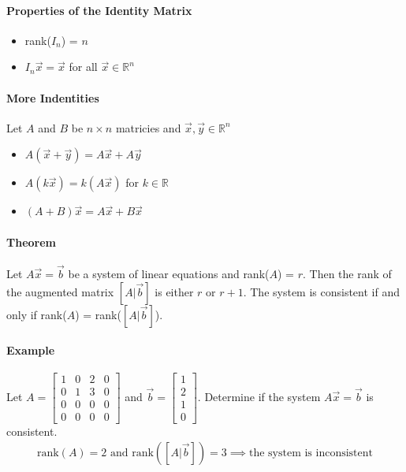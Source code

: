 \paragraph*{Properties of the Identity Matrix}
\begin{itemize}
    \item rank($I_n$) = $n$
    \item $I_n\vec{x} = \vec{x}$ for all $\vec{x} \in \mathbb{R}^n$
\end{itemize}

\paragraph*{More Indentities}
Let $A$ and $B$ be $n \times n$ matricies and $\vec{x}, \vec{y} \in \mathbb{R}^n$
\begin{itemize}
    \item $A(\vec{x} + \vec{y}) = A\vec{x} + A\vec{y}$
    \item $A(k\vec{x}) = k(A\vec{x})$ for $k \in \mathbb{R}$
    \item $(A + B)\vec{x} = A\vec{x} + B\vec{x}$
\end{itemize}

\paragraph*{Theorem}
Let $A\vec{x} = \vec{b}$ be a system of linear equations and rank($A$) = $r$. Then the 
rank of the augmented matrix $[A | \vec{b}]$ is either $r$ or $r + 1$. 
The system is consistent if and only if rank($A$) = rank($[A | \vec{b}]$).

\paragraph*{Example} Let $A = \begin{bmatrix}
    1 & 0 & 2 & 0 \\
    0 & 1 & 3 & 0 \\
    0 & 0 & 0 & 0 \\
    0 & 0 & 0 & 0
\end{bmatrix}$ and $\vec{b} = \begin{bmatrix} 1 \\ 2 \\ 1 \\ 0 \end{bmatrix}$. Determine if the system $A\vec{x} = \vec{b}$ is consistent.
\begin{align*}
    \text{rank}(A) = 2 \text{ and rank}([A | \vec{b}]) = 3 \implies \text{the system is inconsistent}
\end{align*}

